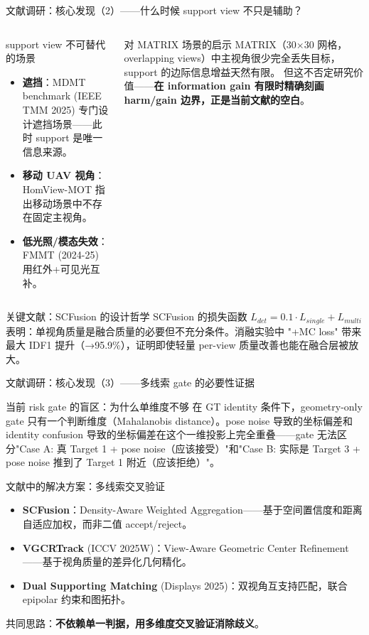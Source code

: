 \documentclass[aspectratio=169,xcolor=dvipsnames]{beamer}
\begin{document}
\begin{frame}{文献调研：核心发现（2）——什么时候 support view 不只是辅助？}
\small
\begin{columns}[T,onlytextwidth]
  \begin{block}{support view 不可替代的场景}
  \begin{itemize}
    \item \textbf{遮挡}：MDMT benchmark (IEEE TMM 2025) 专门设计遮挡场景——此时 support 是唯一信息来源。
    \item \textbf{移动 UAV 视角}：HomView-MOT 指出移动场景中不存在固定主视角。
    \item \textbf{低光照/模态失效}：FMMT (2024-25) 用红外+可见光互补。
  \end{itemize}
  \end{block}

  \begin{block}{对 MATRIX 场景的启示}
  MATRIX（30×30 网格，overlapping views）中主视角很少完全丢失目标，support 的边际信息增益天然有限。
  但这不否定研究价值——\textbf{在 information gain 有限时精确刻画 harm/gain 边界，正是当前文献的空白}。
  \end{block}
\end{columns}

\vspace{2mm}
\begin{block}{关键文献：SCFusion 的设计哲学}
SCFusion 的损失函数 \(L_{det} = 0.1 \cdot L_{single} + L_{multi}\) 表明：单视角质量是融合质量的必要但不充分条件。消融实验中 "+MC loss" 带来最大 IDF1 提升（→95.9\%），证明即使轻量 per-view 质量改善也能在融合层被放大。
\end{block}
\end{frame}

\begin{frame}{文献调研：核心发现（3）——多线索 gate 的必要性证据}
\small
\begin{block}{当前 risk gate 的盲区：为什么单维度不够}
在 GT identity 条件下，geometry-only gate 只有一个判断维度（Mahalanobis distance）。pose noise 导致的坐标偏差和 identity confusion 导致的坐标偏差在这个一维投影上完全重叠——gate 无法区分"Case A: 真 Target 1 + pose noise（应该接受）"和"Case B: 实际是 Target 3 + pose noise 推到了 Target 1 附近（应该拒绝）"。
\end{block}

\begin{block}{文献中的解决方案：多线索交叉验证}
\begin{itemize}
  \item \textbf{SCFusion}：Density-Aware Weighted Aggregation——基于空间置信度和距离自适应加权，而非二值 accept/reject。
  \item \textbf{VGCRTrack} (ICCV 2025W)：View-Aware Geometric Center Refinement——基于视角质量的差异化几何精化。
  \item \textbf{Dual Supporting Matching} (Displays 2025)：双视角互支持匹配，联合 epipolar 约束和图拓扑。
\end{itemize}
共同思路：\textbf{不依赖单一判据，用多维度交叉验证消除歧义}。
\end{block}
\end{frame}
\end{document}
